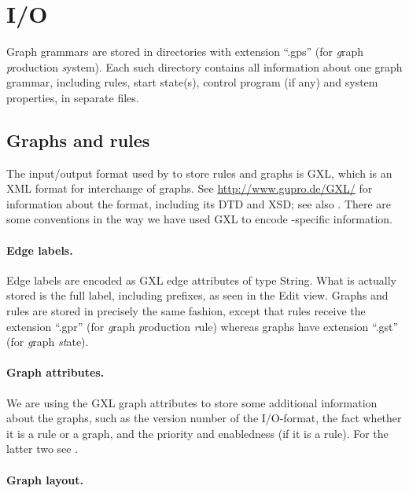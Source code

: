 \section{I/O}

Graph grammars are stored in directories with extension ``\textsf{.gps}'' (for
\emph{g}raph \emph{p}roduction \emph{s}ystem). Each such directory contains all
information about one graph grammar, including rules, start state(s), control
program (if any) and system properties, in separate files.

\subsection{Graphs and rules}

The input/output format used by \Groove{} to store rules and graphs is GXL,
which is an XML format for interchange of graphs. See
\url{http://www.gupro.de/GXL/} for information about the format, including its
DTD and XSD; see also \cite{GXL}. There are some conventions in the way we have
used GXL to encode \Groove-specific information.

\paragraph{Edge labels.}

Edge labels are encoded as GXL edge attributes of type \textsf{String}. What is
actually stored is the full label, including prefixes, as seen in the Edit
view. Graphs and rules are stored in precisely the same fashion, except that
rules receive the extension ``\textsf{.gpr}'' (for \emph{g}raph
\emph{p}roduction \emph{r}ule) whereas graphs have extension ``\textsf{.gst}''
(for \emph{g}raph \emph{st}ate).

\paragraph{Graph attributes.}

We are using the GXL graph attributes to store some additional information
about the graphs, such as the version number of the I/O-format, the fact
whether it is a rule or a graph, and the priority and enabledness (if it is a
rule). For the latter two see .

\paragraph{Graph layout.}

